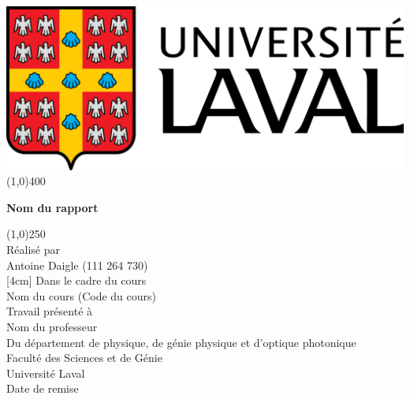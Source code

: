 \begin{titlepage}
    \begin{center}
    \includegraphics[scale=0.15]{Figure/ULaval.png}
    \line(1,0){400}\\
    [2mm]
    \begin{large}
    \textbf{Nom du rapport}\\ 
    \end{large}
    \line(1,0){250}\\
    [1.5cm]
    Réalisé par\\
    Antoine Daigle (111 264 730)\\
    [4cm]
    Dans le cadre du cours\\
    Nom du cours (Code du cours)\\
    [2.5cm]
    Travail présenté à\\
    Nom du professeur\\
    [4cm]
    Du département de physique, de génie physique et d'optique photonique\\
    Faculté des Sciences et de Génie\\
    Université Laval\\
    Date de remise
    \end{center} 
    \end{titlepage}